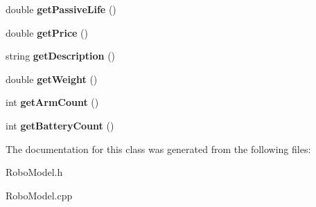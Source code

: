 \begin{DoxyCompactItemize}
\item 
double {\bfseries get\+Passive\+Life} ()\hypertarget{classRoboModel_a08dd55045dccb3d4a813d4873df736f0}{}\label{classRoboModel_a08dd55045dccb3d4a813d4873df736f0}

\item 
double {\bfseries get\+Price} ()\hypertarget{classRoboModel_a71dc72856f61878f3e9403cab60d8382}{}\label{classRoboModel_a71dc72856f61878f3e9403cab60d8382}

\item 
string {\bfseries get\+Description} ()\hypertarget{classRoboModel_adffed46f73dfb49c02adabf96f91ebb4}{}\label{classRoboModel_adffed46f73dfb49c02adabf96f91ebb4}

\item 
double {\bfseries get\+Weight} ()\hypertarget{classRoboModel_a86dc373993b37f0c33c00feafc8d6ffa}{}\label{classRoboModel_a86dc373993b37f0c33c00feafc8d6ffa}

\item 
int {\bfseries get\+Arm\+Count} ()\hypertarget{classRoboModel_ab366b831c341280e04d0855c0bcdbe9a}{}\label{classRoboModel_ab366b831c341280e04d0855c0bcdbe9a}

\item 
int {\bfseries get\+Battery\+Count} ()\hypertarget{classRoboModel_a6074b5258f50030f658883c5626e3ed8}{}\label{classRoboModel_a6074b5258f50030f658883c5626e3ed8}

\end{DoxyCompactItemize}


The documentation for this class was generated from the following files\+:\begin{DoxyCompactItemize}
\item 
Robo\+Model.\+h\item 
Robo\+Model.\+cpp\end{DoxyCompactItemize}
